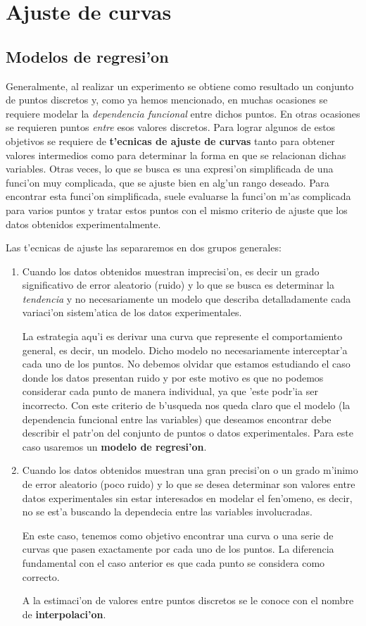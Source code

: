 \documentclass[a4paper]{report}
\begin{document}
\chapter{Ajuste de curvas}

\section{Modelos de regresi'on}

Generalmente, al realizar un experimento se obtiene como resultado un conjunto de puntos discretos y, como ya hemos mencionado, en muchas ocasiones se requiere modelar la \textit{dependencia funcional} entre dichos puntos. En otras ocasiones se requieren puntos \textit{entre} esos valores discretos. Para lograr algunos de estos objetivos se requiere de \textbf{t'ecnicas de ajuste de curvas} tanto para obtener valores intermedios como para determinar la forma en que se relacionan dichas variables. 
Otras veces, lo que se busca es una expresi'on simplificada de una funci'on muy complicada, que se ajuste bien en alg'un rango deseado. Para encontrar esta funci'on simplificada, suele evaluarse la funci'on m'as complicada para varios puntos y tratar estos puntos con el mismo criterio de ajuste que los datos obtenidos experimentalmente.
 
Las t'ecnicas de ajuste las separaremos en dos grupos generales:
\begin{enumerate}
\item Cuando los datos obtenidos muestran imprecisi'on, es decir un grado significativo de error aleatorio (ruido) y lo que se busca es determinar la \textit{tendencia} y no necesariamente un modelo que describa detalladamente cada variaci'on sistem'atica de los datos experimentales.

La estrategia aqu'i es derivar una curva que represente el comportamiento general, es decir, un modelo. Dicho modelo no necesariamente interceptar'a cada uno de los  puntos. No debemos olvidar que estamos estudiando el caso donde los datos presentan ruido y por este motivo es que no podemos considerar cada punto de manera individual, ya que 'este podr'ia ser incorrecto. Con este criterio de b'usqueda nos queda claro que el modelo (la dependencia funcional entre las variables) que deseamos encontrar debe describir el patr'on del conjunto de puntos o datos experimentales. Para este caso usaremos un \textbf{modelo de regresi'on}.

\item Cuando los datos obtenidos muestran una gran precisi'on o un grado m'inimo de error aleatorio (poco ruido) y lo que se desea determinar son valores entre datos experimentales sin estar interesados en modelar el fen'omeno, es decir, no se est'a buscando la dependecia entre las variables involucradas.
 
	En este caso, tenemos como objetivo encontrar una curva o una serie de curvas que pasen exactamente por cada uno de los puntos. La diferencia fundamental con el caso anterior es que cada punto se considera como correcto. 
	
A la estimaci'on de valores entre puntos discretos se le conoce con el nombre de \textbf{interpolaci'on}.
\end{enumerate}
\end{document}
